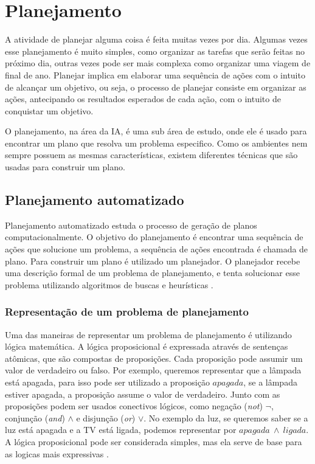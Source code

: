 \chapter{\label{chap:planejamento}Planejamento}

A atividade de planejar alguma coisa é feita muitas vezes por dia. Algumas vezes esse planejamento é muito simples, como organizar as tarefas que serão feitas no próximo dia, outras vezes pode ser mais complexa como organizar uma viagem de final de ano. Planejar implica em elaborar uma sequência de ações com o intuito de alcançar um objetivo, ou seja, o processo de planejar consiste em organizar as ações, antecipando os resultados esperados de cada ação, com o intuito de conquistar um objetivo. 

O planejamento, na área da IA, é uma sub área de estudo, onde ele é usado para encontrar um plano que resolva um problema especifico. Como os ambientes nem sempre possuem as mesmas características, existem diferentes técnicas que são usadas para construir um plano.

\section{Planejamento automatizado}

Planejamento automatizado estuda o processo de geração de planos computacionalmente. O objetivo do planejamento é encontrar uma sequência de ações que solucione um problema, a sequência de ações encontrada é chamada de plano. Para construir um plano é utilizado um planejador. O planejador recebe uma descrição formal de um problema de planejamento, e tenta solucionar esse problema utilizando algoritmos de buscas e heurísticas \cite{ghallab2004automated, intelligence2003modern}.

\subsection{Representação de um problema de planejamento}

Uma das maneiras de representar um problema de planejamento é utilizando lógica matemática. A lógica proposicional é expressada através de sentenças atômicas, que são compostas de proposições. Cada proposição pode assumir um valor de verdadeiro ou falso. Por exemplo, queremos representar que a lâmpada está apagada, para isso pode ser utilizado a proposição $apagada$, se a lâmpada estiver apagada, a proposição assume o valor de verdadeiro. Junto com as proposições podem ser usados conectivos lógicos, como negação (\textit{not}) $\neg$, conjunção (\textit{and}) $\wedge$ e disjunção (\textit{or}) $\vee$. No exemplo da luz, se queremos saber se a luz está apagada e a TV está ligada, podemos representar por $apagada~ \wedge~ ligada$. A lógica proposicional pode ser considerada simples, mas ela serve de base para as logicas mais expressivas \cite{intelligence2003modern}. 

